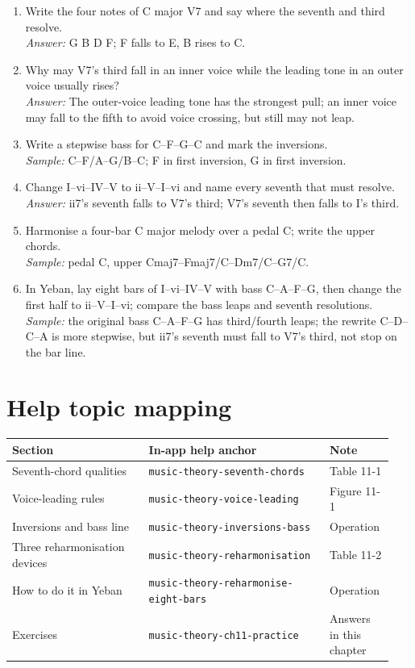 \begin{exercise}
\begin{enumerate}
  \item Write the four notes of C major V7 and say where the seventh and third resolve.\\
  \emph{Answer:} G B D F; F falls to E, B rises to C.
  \item Why may V7's third fall in an inner voice while the leading tone in an outer voice usually rises?\\
  \emph{Answer:} The outer-voice leading tone has the strongest pull; an inner voice may fall to the fifth to avoid voice crossing, but still may not leap.
  \item Write a stepwise bass for C--F--G--C and mark the inversions.\\
  \emph{Sample:} C--F/A--G/B--C; F in first inversion, G in first inversion.
  \item Change I--vi--IV--V to ii--V--I--vi and name every seventh that must resolve.\\
  \emph{Answer:} ii7's seventh falls to V7's third; V7's seventh then falls to I's third.
  \item Harmonise a four-bar C major melody over a pedal C; write the upper chords.\\
  \emph{Sample:} pedal C, upper Cmaj7--Fmaj7/C--Dm7/C--G7/C.
  \item In Yeban, lay eight bars of I--vi--IV--V with bass C--A--F--G, then change the first half to ii--V--I--vi; compare the bass leaps and seventh resolutions.\\
  \emph{Sample:} the original bass C--A--F--G has third/fourth leaps; the rewrite C--D--C--A is more stepwise, but ii7's seventh must fall to V7's third, not stop on the bar line.
\end{enumerate}
\end{exercise}

\section{Help topic mapping}
\begin{center}
\footnotesize
\setlength{\tabcolsep}{3pt}
\begin{longtable}{p{0.34\linewidth}p{0.45\linewidth}p{0.15\linewidth}}
\toprule
Section & In-app help anchor & Note \\
\midrule
\endhead
Seventh-chord qualities & \texttt{music-theory-seventh-chords} & Table 11-1 \\
Voice-leading rules & \texttt{music-theory-voice-leading} & Figure 11-1 \\
Inversions and bass line & \texttt{music-theory-inversions-bass} & Operation \\
Three reharmonisation devices & \texttt{music-theory-reharmonisation} & Table 11-2 \\
How to do it in Yeban & \texttt{music-theory-reharmonise-eight-bars} & Operation \\
Exercises & \texttt{music-theory-ch11-practice} & Answers in this chapter \\
\bottomrule
\end{longtable}
\end{center}

